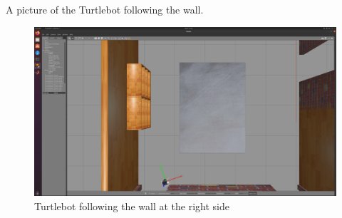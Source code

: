 \documentclass[12pt,a4paper]{article}
\begin{document}
	A picture of the Turtlebot following the wall.
	\begin{figure}[!h]
		\centering
		\includegraphics[width=\linewidth]{fig6.png}
		\caption{Turtlebot following the wall at the right side}
		\label{fig:fig6}
	\end{figure}
	\clearpage
\end{document}
